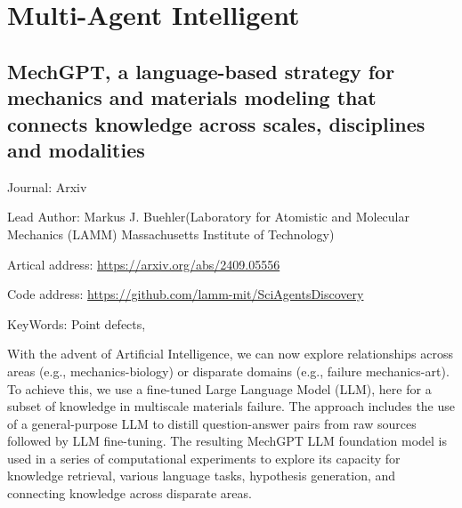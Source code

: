 \documentclass[11pt]{elegantbook}
\begin{document}
\section{Multi-Agent Intelligent}
\subsection{MechGPT, a language-based strategy for mechanics and materials modeling that connects knowledge across scales, disciplines and modalities}
\begin{brief}
    \item Journal: Arxiv
    \item Lead Author: Markus J. Buehler(Laboratory for Atomistic and Molecular Mechanics (LAMM) Massachusetts Institute of Technology)
    \item Artical address: \href{https://arxiv.org/abs/2409.05556}{https://arxiv.org/abs/2409.05556}
    \item Code address: \href{https://github.com/lamm-mit/SciAgentsDiscovery}{https://github.com/lamm-mit/SciAgentsDiscovery}
    \item KeyWords: Point defects, 
\end{brief}
With the advent of
Artificial Intelligence, we can now explore relationships across areas (e.g., mechanics-biology) or disparate domains
(e.g., failure mechanics-art). To achieve this, we use a fine-tuned Large Language Model (LLM), here for a subset of
knowledge in multiscale materials failure. The approach includes the use of a general-purpose LLM to distill
question-answer pairs from raw sources followed by LLM fine-tuning. The resulting MechGPT LLM foundation
model is used in a series of computational experiments to explore its capacity for knowledge retrieval, various
language tasks, hypothesis generation, and connecting knowledge across disparate areas. 
\end{document}
